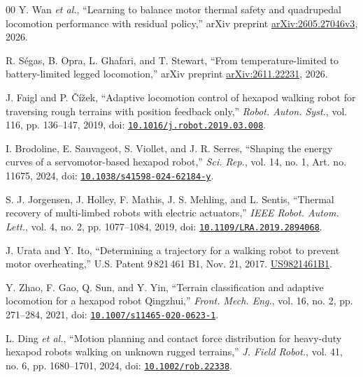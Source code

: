 \documentclass{ieeeaccess}
\begin{document}
\begin{thebibliography}{00}
Y. Wan \emph{et al.}, \textquotedblleft{}Learning to balance motor thermal safety and quadrupedal locomotion performance with residual policy,\textquotedblright{} arXiv preprint \href{https://arxiv.org/abs/2605.27046v3}{arXiv:2605.27046v3}, 2026.

R. Ségas, B. Opra, L. Ghafari, and T. Stewart, \textquotedblleft{}From temperature-limited to battery-limited legged locomotion,\textquotedblright{} arXiv preprint \href{https://arxiv.org/abs/2611.22231}{arXiv:2611.22231}, 2026.

J. Faigl and P. Čížek, \textquotedblleft{}Adaptive locomotion control of hexapod walking robot for traversing rough terrains with position feedback only,\textquotedblright{} \emph{Robot. Auton. Syst.}, vol. 116, pp. 136--147, 2019, doi: \href{https://doi.org/10.1016/j.robot.2019.03.008}{\nolinkurl{10.1016/j.robot.2019.03.008}}.

I. Brodoline, E. Sauvageot, S. Viollet, and J. R. Serres, \textquotedblleft{}Shaping the energy curves of a servomotor-based hexapod robot,\textquotedblright{} \emph{Sci. Rep.}, vol. 14, no. 1, Art. no. 11675, 2024, doi: \href{https://doi.org/10.1038/s41598-024-62184-y}{\nolinkurl{10.1038/s41598-024-62184-y}}.

S. J. Jorgensen, J. Holley, F. Mathis, J. S. Mehling, and L. Sentis, \textquotedblleft{}Thermal recovery of multi-limbed robots with electric actuators,\textquotedblright{} \emph{IEEE Robot. Autom. Lett.}, vol. 4, no. 2, pp. 1077--1084, 2019, doi: \href{https://doi.org/10.1109/LRA.2019.2894068}{\nolinkurl{10.1109/LRA.2019.2894068}}.

J. Urata and Y. Ito, \textquotedblleft{}Determining a trajectory for a walking robot to prevent motor overheating,\textquotedblright{} U.S. Patent 9\,821\,461 B1, Nov. 21, 2017. \href{https://patents.google.com/patent/US9821461B1/en}{US9821461B1}.

Y. Zhao, F. Gao, Q. Sun, and Y. Yin, \textquotedblleft{}Terrain classification and adaptive locomotion for a hexapod robot Qingzhui,\textquotedblright{} \emph{Front. Mech. Eng.}, vol. 16, no. 2, pp. 271--284, 2021, doi: \href{https://doi.org/10.1007/s11465-020-0623-1}{\nolinkurl{10.1007/s11465-020-0623-1}}.

L. Ding \emph{et al.}, \textquotedblleft{}Motion planning and contact force distribution for heavy-duty hexapod robots walking on unknown rugged terrains,\textquotedblright{} \emph{J. Field Robot.}, vol. 41, no. 6, pp. 1680--1701, 2024, doi: \href{https://doi.org/10.1002/rob.22338}{\nolinkurl{10.1002/rob.22338}}.


\end{thebibliography}
\end{document}
